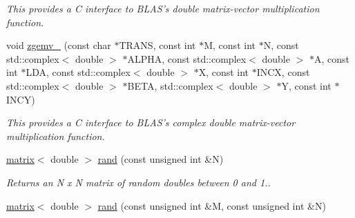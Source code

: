 \begin{DoxyCompactItemize}
\begin{DoxyCompactList}\small\item\em This provides a C interface to B\-L\-A\-S's double matrix-\/vector multiplication function. \end{DoxyCompactList}\item 
\hypertarget{namespacekeycpp_aea174778653491b5fd21dd2960c0f7cb}{void \hyperlink{namespacekeycpp_aea174778653491b5fd21dd2960c0f7cb}{zgemv\-\_\-} (const char $\ast$T\-R\-A\-N\-S, const int $\ast$M, const int $\ast$N, const std\-::complex$<$ double $>$ $\ast$A\-L\-P\-H\-A, const std\-::complex$<$ double $>$ $\ast$A, const int $\ast$L\-D\-A, const std\-::complex$<$ double $>$ $\ast$X, const int $\ast$I\-N\-C\-X, const std\-::complex$<$ double $>$ $\ast$B\-E\-T\-A, std\-::complex$<$ double $>$ $\ast$Y, const int $\ast$I\-N\-C\-Y)}\label{namespacekeycpp_aea174778653491b5fd21dd2960c0f7cb}

\begin{DoxyCompactList}\small\item\em This provides a C interface to B\-L\-A\-S's complex double matrix-\/vector multiplication function. \end{DoxyCompactList}\item 
\hypertarget{namespacekeycpp_ab99a9561cf5654ae722a0879b41d9d73}{\hyperlink{classkeycpp_1_1matrix}{matrix}$<$ double $>$ \hyperlink{namespacekeycpp_ab99a9561cf5654ae722a0879b41d9d73}{rand} (const unsigned int \&N)}\label{namespacekeycpp_ab99a9561cf5654ae722a0879b41d9d73}

\begin{DoxyCompactList}\small\item\em Returns an N x N matrix of random doubles between 0 and 1.. \end{DoxyCompactList}\item 
\hypertarget{namespacekeycpp_af6413232f2de6f8ac96efde6531c3055}{\hyperlink{classkeycpp_1_1matrix}{matrix}$<$ double $>$ \hyperlink{namespacekeycpp_af6413232f2de6f8ac96efde6531c3055}{rand} (const unsigned int \&M, const unsigned int \&N)}\label{namespacekeycpp_af6413232f2de6f8ac96efde6531c3055}


\end{DoxyCompactItemize}
